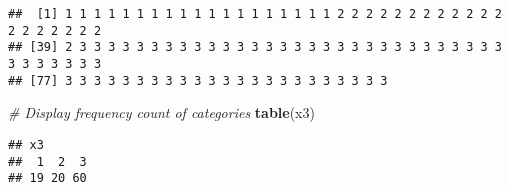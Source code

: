 \documentclass[
]{article}
\newenvironment{Shaded}{\begin{snugshade}}{\end{snugshade}}
\newcommand{\CommentTok}[1]{\textcolor[rgb]{0.56,0.35,0.01}{\textit{#1}}}
\newcommand{\FunctionTok}[1]{\textcolor[rgb]{0.13,0.29,0.53}{\textbf{#1}}}
\newcommand{\NormalTok}[1]{#1}
\begin{document}
\begin{verbatim}
##  [1] 1 1 1 1 1 1 1 1 1 1 1 1 1 1 1 1 1 1 1 2 2 2 2 2 2 2 2 2 2 2 2 2 2 2 2 2 2 2
## [39] 2 3 3 3 3 3 3 3 3 3 3 3 3 3 3 3 3 3 3 3 3 3 3 3 3 3 3 3 3 3 3 3 3 3 3 3 3 3
## [77] 3 3 3 3 3 3 3 3 3 3 3 3 3 3 3 3 3 3 3 3 3 3 3
\end{verbatim}

\begin{Shaded}
\begin{Highlighting}[]
\CommentTok{\# Display frequency count of categories}
\FunctionTok{table}\NormalTok{(x3)}
\end{Highlighting}
\end{Shaded}

\begin{verbatim}
## x3
##  1  2  3 
## 19 20 60
\end{verbatim}
\end{document}
